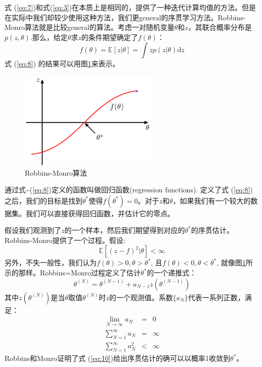 \documentclass[10pt,a4paper,UTF8]{article}
\begin{document}
式 (\ref{eq:7})和式(\ref{eq:3})在本质上是相同的，提供了一种迭代计算均值的方法。但是在实际中我们却较少使用这种方法，我们更general的序贯学习方法。Robbins-Monro算法就是比较general的算法。考虑一对随机变量\(\theta\)和\(z\)，其联合概率分布是\(p(z,\theta)\).那么，给定\(\theta\)求\(z\)的条件期望确定了\(f(\theta)\)：
\begin{equation}
\label{eq:8}
f(\theta) = \mathbb{E}[z|\theta] = \int zp(z|\theta)\mathrm{d}z
\end{equation}
式 (\ref{eq:8}) 的结果可以用图\ref{fig:orgcb0bcae}来表示。
\begin{figure}[htbp]
\centering
\includegraphics[width=0.6\textwidth]{../../img/computer_prml/20170616figure2dot10.png}
\caption{\label{fig:orgcb0bcae}
Robbins-Monro算法}
\end{figure}

通过式\textasciitilde{}(\ref{eq:8})定义的函数叫做回归函数(regression functions). 定义了式 (\ref{eq:8})之后，我们的目标是找到\(\theta^{*}\)使得\(f(\theta^{*}) = 0\)。对于\(z\)和\(\theta\)，如果我们有一个较大的数据集。我们可以直接获得回归函数，并估计它的零点。

假设我们观测到了\(z\)的一个样本，然后我们期望得到对应的\(\theta^{*}\)的序贯估计。Robbins-Monro提供了一个过程。假设:
\begin{equation}
\label{eq:9}
\mathbb{E}[(z-f)^{2}|\theta] < \infty
\end{equation}
另外，不失一般性，我们认为\(f(\theta) > 0, \theta > \theta^{*}\), 且\(f(\theta ) < 0, \theta < \theta^{*}\), 就像图\ref{fig:orgcb0bcae}所示的那样。Robbins=Monro过程定义了估计\(\theta^{*}\)的一个递推式：
\begin{equation}
\label{eq:10}
\theta^{(N)} = \theta^{(N-1)} + a_{N-1}z(\theta^{(N-1)})
\end{equation}
其中\(z(\theta^{(N)})\)是当\(\theta\)取值\(\theta^{(N)}\)时\(z\)的一个观测值。系数\(\{a_{N}\}\)代表一系列正数，满足：
\begin{eqnarray}
\label{eq:11}
\lim_{N\to \infty} a_{N}&=& 0 \\
\sum_{N=1}^{\infty}a_{N}&=& \infty \\
\sum_{N=1}^{\infty}a_{N}^{2}& < & \infty
\end{eqnarray}
Robbins和Monro证明了式 (\ref{eq:10})给出序贯估计的确可以以概率1收敛到\(\theta^{*}\)。
\end{document}
